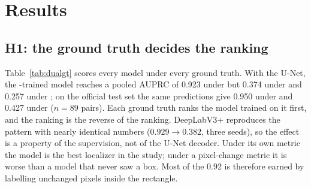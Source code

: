 \section{Results}
\label{sec:results}

\subsection{H1: the ground truth decides the ranking}
\label{sec:res-h1}
Table~\ref{tab:dualgt} scores every model under every ground truth. With the U-Net, the \GTb-trained model reaches a pooled AUPRC of 0.923 under \GTb{} but 0.374 under \GTp{} and 0.257 under \GTg; on the official test set the same predictions give 0.950 under \GTb{} and 0.427 under \GTp{} ($n{=}89$ pairs). Each ground truth ranks the model trained on it first, and the \GTb{} ranking is the reverse of the \GTg{} ranking. DeepLabV3+ reproduces the pattern with nearly identical numbers ($0.929 \rightarrow 0.382$, three seeds), so the effect is a property of the supervision, not of the U-Net decoder. Under its own metric the \GTb{} model is the best localizer in the study; under a pixel-change metric it is worse than a model that never saw a box. Most of the 0.92 is therefore earned by labelling unchanged pixels inside the rectangle.

